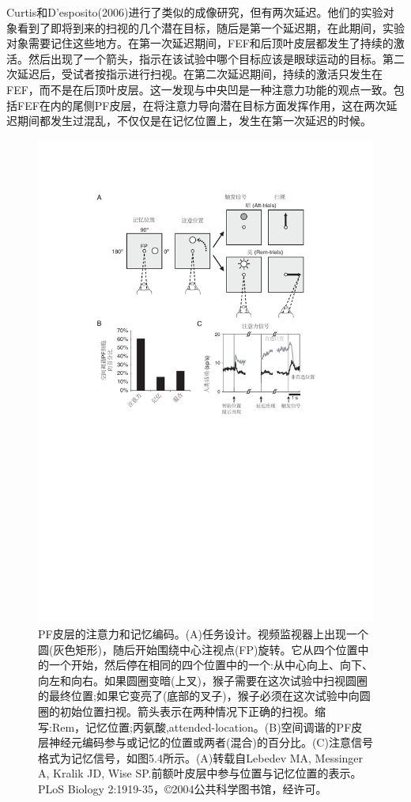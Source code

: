 \begin{enumerate}
	Curtis和D’esposito(2006)进行了类似的成像研究，但有两次延迟。他们的实验对象看到了即将到来的扫视的几个潜在目标，随后是第一个延迟期，在此期间，实验对象需要记住这些地方。在第一次延迟期间，FEF和后顶叶皮层都发生了持续的激活。然后出现了一个箭头，指示在该试验中哪个目标应该是眼球运动的目标。第二次延迟后，受试者按指示进行扫视。在第二次延迟期间，持续的激活只发生在FEF，而不是在后顶叶皮层。这一发现与中央凹是一种注意力功能的观点一致。包括FEF在内的尾侧PF皮层，在将注意力导向潜在目标方面发挥作用，这在两次延迟期间都发生过混乱，不仅仅是在记忆位置上，发生在第一次延迟的时候。
\end{enumerate}
\begin{figure}
	\centering
	\includegraphics[width=0.7\linewidth]{image_pfc/Fig_5_6}
	\caption{PF皮层的注意力和记忆编码。(A)任务设计。视频监视器上出现一个圆(灰色矩形)，随后开始围绕中心注视点(FP)旋转。它从四个位置中的一个开始，然后停在相同的四个位置中的一个:从中心向上、向下、向左和向右。如果圆圈变暗(上叉)，猴子需要在这次试验中扫视圆圈的最终位置;如果它变亮了(底部的叉子)，猴子必须在这次试验中向圆圈的初始位置扫视。箭头表示在两种情况下正确的扫视。缩写:Rem，记忆位置;丙氨酸,attended-location。(B)空间调谐的PF皮层神经元编码参与或记忆的位置或两者(混合)的百分比。(C)注意信号格式为记忆信号，如图5.4所示。(A)转载自Lebedev MA, Messinger A, Kralik JD, Wise SP.前额叶皮层中参与位置与记忆位置的表示。PLoS Biology 2:1919-35，©2004公共科学图书馆，经许可。}
	\label{fig:fig}
\end{figure}

